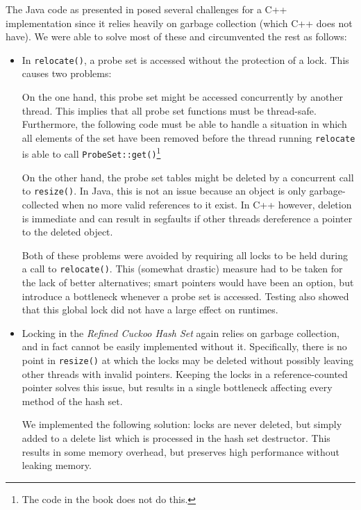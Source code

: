 \documentclass[a4paper,10pt]{article}
\begin{document}
The Java code as presented in \cite{herlihy} posed several challenges for
a C++ implementation since it relies heavily on garbage collection (which C++
does not have). We were able to solve most of these and circumvented the rest
as follows:

\begin{itemize}
\item In \lstinline|relocate()|, a probe set is accessed without the
    protection of a lock. This causes two problems:
    
    On the one hand, this probe set might be accessed concurrently
    by another thread. This implies that all probe set functions must be
    thread-safe. Furthermore, the following code must be able to handle a
    situation in which all elements of the set have been removed before the
    thread running \lstinline|relocate| is able to call
    \lstinline|ProbeSet::get()|\footnote{The code in the book does not do
    this.}
    
    On the other hand, the probe set tables might be deleted by a concurrent
    call to \lstinline|resize()|. In Java, this is not an issue because an
    object is only garbage-collected when no more valid references to it exist.
    In C++ however, deletion is immediate and can result in segfaults if other
    threads dereference a pointer to the deleted object. 
    
    Both of these problems were avoided by requiring all locks to be held during
    a call to \lstinline|relocate()|. This (somewhat drastic) measure had to be
    taken for the lack of better alternatives; smart pointers would have been
    an option, but introduce a bottleneck whenever a probe set is accessed.
    Testing also showed that this global lock did not have a large effect on runtimes.

\item Locking in the \emph{Refined Cuckoo Hash Set} again relies on garbage collection, and
    in fact cannot be easily implemented without it. Specifically, there is no point
    in \lstinline|resize()| at which the locks may be deleted without possibly leaving
    other threads with invalid pointers. Keeping the locks in a reference-counted pointer
    solves this issue, but results in a single bottleneck affecting every method of the 
    hash set.
    
    We implemented the following solution: locks are never deleted, but simply added
    to a delete list which is processed in the hash set destructor. This results in
    some memory overhead, but preserves high performance without leaking memory.
\end{itemize}
\end{document}
